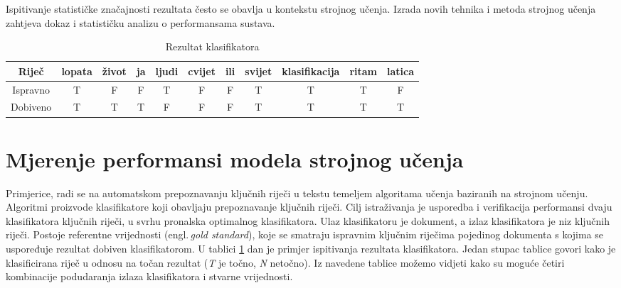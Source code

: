 Ispitivanje statističke značajnosti rezultata često se obavlja u kontekstu strojnog učenja. Izrada novih tehnika i metoda strojnog učenja zahtjeva dokaz i statističku analizu o performansama sustava. 

\begin{table}
\centering
\begin{tabular}{|c||c|c|c|c|c|c|c|c|c|c|}
\hline
Riječ & lopata & život & ja & ljudi & cvijet & ili & svijet & klasifikacija & ritam & latica \\ \hline
Ispravno & T & F & F & T & F & F & T & T & T & F \\ \hline
Dobiveno & T & T & T & F & F & F & T & T & T & T \\ \hline
\end{tabular}
\caption{Rezultat klasifikatora}
\label{tab:usporedba_predict_gold}
\end{table}

\section{Mjerenje performansi modela strojnog učenja}

Primjerice, radi se na automatskom prepoznavanju ključnih riječi u tekstu temeljem algoritama učenja baziranih na strojnom učenju. Algoritmi proizvode klasifikatore koji obavljaju prepoznavanje ključnih riječi. Cilj istraživanja je usporedba i verifikacija performansi dvaju klasifikatora ključnih riječi, u svrhu pronalska optimalnog klasifikatora. Ulaz klasifikatoru je dokument, a izlaz klasifikatora je niz ključnih riječi. Postoje referentne vrijednosti (engl.\,\textit{gold standard}), koje se smatraju ispravnim ključnim riječima pojedinog dokumenta s kojima se uspoređuje rezultat dobiven klasifikatorom. U tablici \ref{tab:usporedba_predict_gold} dan je primjer ispitivanja rezultata klasifikatora. Jedan stupac tablice govori kako je klasificirana riječ u odnosu na točan rezultat (\textit{T} je točno, \textit{N} netočno). Iz navedene tablice možemo vidjeti kako su moguće četiri kombinacije podudaranja izlaza klasifikatora i stvarne vrijednosti. 

